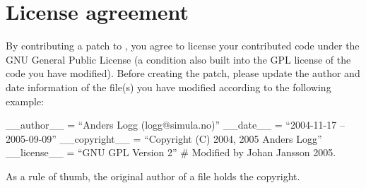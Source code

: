 

\section{License agreement}

By contributing a patch to \package{}, you agree to license your
contributed code under the GNU General Public License (a condition
also built into the GPL license of the code you have modified). Before
creating the patch, please update the author and date information of
the file(s) you have modified according to the following example:

\begin{code}
 __author__ = ``Anders Logg (logg@simula.no)''
 __date__ = ``2004-11-17 -- 2005-09-09''
 __copyright__ = ``Copyright (C) 2004, 2005 Anders Logg''
 __license__  = ``GNU GPL Version 2''
 # Modified by Johan Jansson 2005.
\end{code}

As a rule of thumb, the original author of a file holds the copyright.
